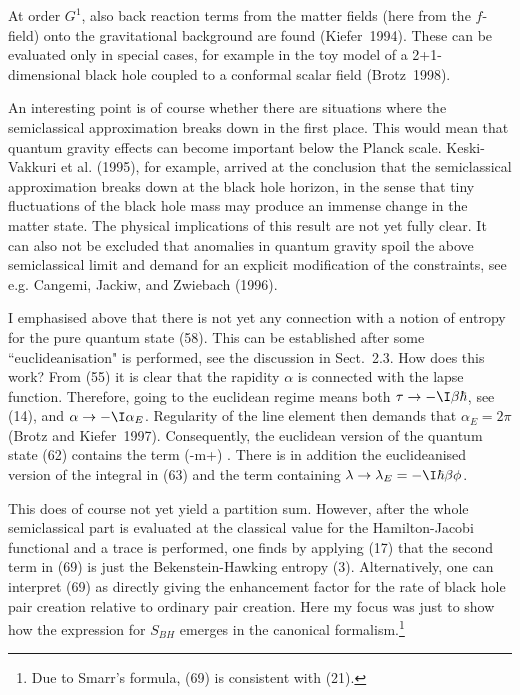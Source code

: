 At order $G^1$, also back reaction terms from the matter fields
(here from the $f$-field) onto the gravitational background
are found (Kiefer~1994). These can be evaluated only in special cases,
for example in the toy model of a 2+1-dimensional black hole
coupled to a conformal scalar field (Brotz~1998).

An interesting point is of course whether there are situations
where the semiclassical approximation breaks down in the first
place. This would mean that quantum gravity effects can become
important below the Planck scale. Keski-Vakkuri et al. (1995), for example,
arrived at the conclusion that the semiclassical approximation
breaks down at the black hole horizon, in the sense that tiny
fluctuations of the black hole mass may produce an immense
change in the matter state. The physical implications of this
result are not yet fully clear. It can also not be excluded that
anomalies in quantum gravity spoil the above semiclassical limit
and demand for an explicit modification of the constraints,
see e.g. Cangemi, Jackiw, and Zwiebach (1996).

I emphasised above that there is not yet any connection with a
notion of entropy for the pure quantum state (58). This can be
established after some ``euclideanisation" is performed,
see the discussion in Sect.~2.3. How does this work?
{}From (55) it is clear that the rapidity $\alpha$ is connected
with the lapse function. Therefore, going to the euclidean regime
means both $\tau\to-\I\beta\hbar$, see (14), and $\alpha\to
-\I\alpha_E$. Regularity of the line element then demands
that $\alpha_E=2\pi$ (Brotz and Kiefer~1997).
Consequently, the euclidean version of the quantum state (62)
contains the term
\be \exp\left(-\beta m+\right) \enspace . \ee 
There is in addition the euclideanised version of the integral
in (63) and the term containing $\lambda\to\lambda_E=-\I\hbar\beta\phi$.

This does of course not yet yield a partition sum.
However, after the whole semiclassical part is evaluated
at the classical value for the Hamilton-Jacobi functional
and a trace is performed, one finds by applying (17) that the
second term in (69) is just the Bekenstein-Hawking entropy (3).
Alternatively, one can interpret (69) as directly giving the
enhancement factor for the rate of black hole pair creation
relative to ordinary pair creation. Here my focus was just to show how
the expression for $S_{BH}$ emerges in the canonical
 formalism.\footnote{Due to Smarr's formula, (69) is consistent
with (21).}

